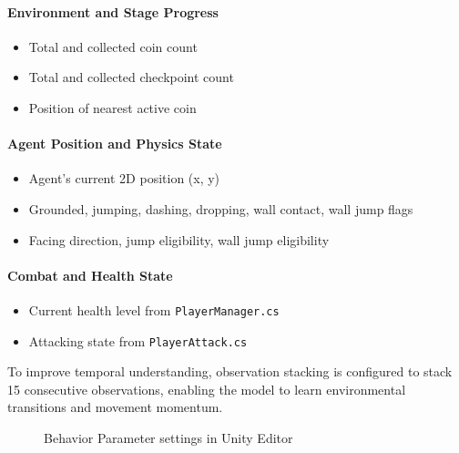 \documentclass[12pt,oneside,openright,a4paper]{cpe-english-project}
\begin{document}
\paragraph{Environment and Stage Progress}
\begin{itemize}
\item Total and collected coin count
\item Total and collected checkpoint count
\item Position of nearest active coin
\end{itemize}

\paragraph{Agent Position and Physics State}
\begin{itemize}
\item Agent’s current 2D position (x, y)
\item Grounded, jumping, dashing, dropping, wall contact, wall jump flags
\item Facing direction, jump eligibility, wall jump eligibility
\end{itemize}

\paragraph{Combat and Health State}
\begin{itemize}
\item Current health level from \texttt{PlayerManager.cs}
\item Attacking state from \texttt{PlayerAttack.cs}
\end{itemize}

To improve temporal understanding, observation stacking is configured to stack 15 consecutive observations, enabling the model to learn environmental transitions and movement momentum.

\begin{figure}[H]
\centering
{}
\caption{Behavior Parameter settings in Unity Editor}\label{fig:BehaviorParameerInspector}
\end{figure}
\end{document}
